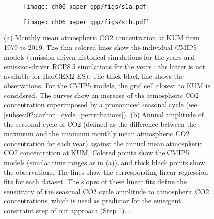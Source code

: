\begin{figure}[p]
  \centering
  \begin{subfigure}[b]{0.39\columnwidth}
    \texttt{[image: ch06\_paper\_gpp/figs/s1a.pdf]}
    \caption{}
    \label{fig:app:b:co2:a}
  \end{subfigure}
  \begin{subfigure}[b]{0.39\columnwidth}
    \texttt{[image: ch06\_paper\_gpp/figs/s1b.pdf]}
    \caption{}
    \label{fig:app:b:co2:b}
  \end{subfigure}
  \begin{subfigure}[b]{0.2\columnwidth}
  \end{subfigure}
  \caption[
    Monthly mean atmospheric \acs{CO2} concentration at \acl{KUM} from 1979 to
    2019 and the corresponding annual amplitudes of the seasonal cycle of
    \acs{CO2}.
  ]{
    (a) Monthly mean atmospheric \acs{CO2} concentration at \acf{KUM} from 1979
    to 2019. The thin colored lines show the individual \acs{CMIP}5 models
    (emission-driven historical simulations for the years 
    and emission-driven \acs{RCP}8.5 simulations for the years
    ; the latter is not available for \acs{HadGEM}2-ES). The
    thick black line shows the observations. For the \acs{CMIP}5 models, the
    grid cell closest to \acs{KUM} is considered. The curves show an increase
    of the atmospheric \acs{CO2} concentration superimposed by a pronounced
    seasonal cycle (see \cref{subsec:02:carbon_cycle_perturbations}). (b)
    Annual amplitude of the seasonal cycle of \acs{CO2} (defined as the
    difference between the maximum and the minimum monthly mean atmospheric
    \acs{CO2} concentration for each year) against the annual mean atmospheric
    \acs{CO2} concentration at \acs{KUM}. Colored points show the \acs{CMIP}5
    models (similar time ranges as in (a)), and thick black points show the
    observations. The lines show the corresponding linear regression fits for
    each dataset. The slopes of these linear fits define the sensitivity of the
    seasonal \acs{CO2} cycle amplitude to atmospheric \acs{CO2} concentrations,
    which is used as predictor for the emergent constraint step of our approach
    (Step 1). .
  }
  \label{fig:app:b:co2}
\end{figure}


